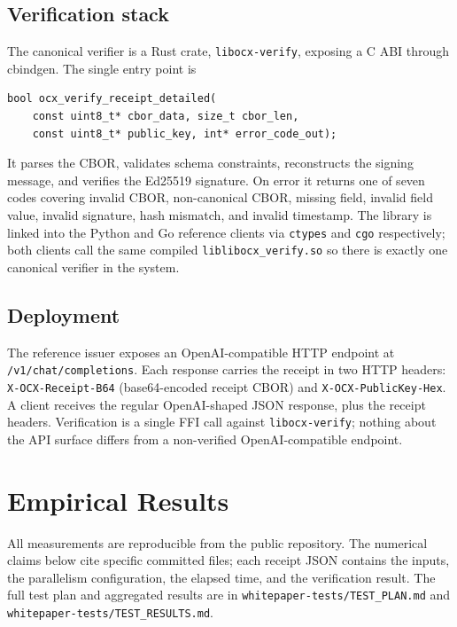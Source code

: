 \documentclass[10pt]{article}
\begin{document}
\subsection{Verification stack}

The canonical verifier is a Rust crate, \texttt{libocx-verify}, exposing a C ABI through cbindgen. The single entry point is

\begin{lstlisting}
bool ocx_verify_receipt_detailed(
    const uint8_t* cbor_data, size_t cbor_len,
    const uint8_t* public_key, int* error_code_out);
\end{lstlisting}

\noindent It parses the CBOR, validates schema constraints, reconstructs the signing message, and verifies the Ed25519 signature. On error it returns one of seven codes covering invalid CBOR, non-canonical CBOR, missing field, invalid field value, invalid signature, hash mismatch, and invalid timestamp. The library is linked into the Python and Go reference clients via \texttt{ctypes} and \texttt{cgo} respectively; both clients call the same compiled \texttt{liblibocx\_verify.so} so there is exactly one canonical verifier in the system.

\subsection{Deployment}

The reference issuer exposes an OpenAI-compatible HTTP endpoint at \texttt{/v1/chat/completions}. Each response carries the receipt in two HTTP headers: \texttt{X-OCX-Receipt-B64} (base64-encoded receipt CBOR) and \texttt{X-OCX-PublicKey-Hex}. A client receives the regular OpenAI-shaped JSON response, plus the receipt headers. Verification is a single FFI call against \texttt{libocx-verify}; nothing about the API surface differs from a non-verified OpenAI-compatible endpoint.

\section{Empirical Results}
\label{sec:empirical}

All measurements are reproducible from the public repository. The numerical claims below cite specific committed files; each receipt JSON contains the inputs, the parallelism configuration, the elapsed time, and the verification result. The full test plan and aggregated results are in \texttt{whitepaper-tests/TEST\_PLAN.md} and \texttt{whitepaper-tests/TEST\_RESULTS.md}.
\end{document}
